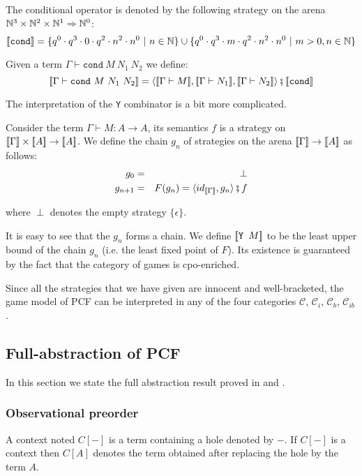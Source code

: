 The conditional operator is denoted by the following strategy on the
arena $\mathbb{N}^3 \times \mathbb{N}^2 \times \mathbb{N} ^1 \Rightarrow \mathbb{N}^0$:
$${[\![ \texttt{cond} ]\!]} =
    \{ q^0 \cdot q^3 \cdot 0 \cdot q^2 \cdot n^2 \cdot n^0 \ | \ n \in \mathbb{N} \}
    \cup
    \{ q^0 \cdot q^3 \cdot m \cdot q^2 \cdot n^2 \cdot n^0 \ | \ m >0, n \in \mathbb{N} \}
    $$


Given a term $\Gamma \vdash \texttt{cond}\ M\ N_1\ N_2$ we define:
$$\sem{\Gamma \vdash \texttt{cond}\ M\ N_1\ N_2} =
\langle \sem{\Gamma \vdash M}, \sem{\Gamma \vdash N_1}, \sem{\Gamma
\vdash N_2} \rangle \fatsemi \sem{\texttt{cond}}$$


The interpretation of the \texttt{Y} combinator is a bit more
complicated.

Consider the term $\Gamma \vdash M : A \rightarrow A$, its semantics
$f$ is a strategy on ${[\![ \Gamma ]\!]} \times {[\![A ]\!]} \rightarrow
{[\![A ]\!]}$. We define the chain $g_n$ of strategies on the arena
${[\![ \Gamma ]\!]} \rightarrow {[\![A ]\!]}$ as follows:
\begin{eqnarray*}
g_0 &=& \perp \\
g_{n+1} &=&  F(g_n) = \langle id_{{[\![ \Gamma ]\!]}}, g_n\rangle \fatsemi f
\end{eqnarray*}

where $\perp$ denotes the empty strategy $\{ \epsilon \}$.

It is easy to see that the $g_n$ forms a chain. We define
${[\![ \texttt{Y } M ]\!]}$ to be the least upper bound of the chain $g_n$
(i.e. the  least fixed point of $F$). Its existence is guaranteed by
the fact that the category of games is cpo-enriched.

Since all the strategies that we have given are innocent and
well-bracketed, the game model of PCF can be interpreted in any of
the four categories $\mathcal{C}$, $\mathcal{C}_i$, $\mathcal{C}_b$,
$\mathcal{C}_{ib}$.



\subsection{Full-abstraction of PCF}
In this section we state the full abstraction result proved in
\cite{abramsky94full} and \cite{hylandong_pcf}.


\subsubsection{Observational preorder}

A context noted $C[-]$ is a term containing a hole denoted by $-$.
If $C[-]$ is a context then $C[A]$ denotes the term obtained after
replacing the hole by the term $A$.

